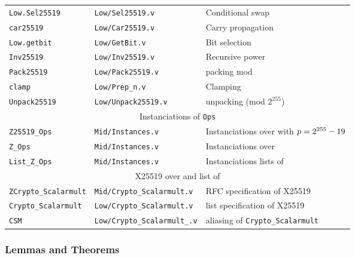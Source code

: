 \begin{table}[h]
\begin{tabular}{ l | l | l }
    \texttt{Low.Sel25519} & \texttt{Low/Sel25519.v} & Conditional swap \\
    \texttt{car25519} & \texttt{Low/Car25519.v} & Carry propagation \\
    \texttt{Low.getbit} & \texttt{Low/GetBit.v} & Bit selection \\
    \texttt{Inv25519} & \texttt{Low/Inv25519.v} & Recursive power \\
    \texttt{Pack25519} & \texttt{Low/Pack25519.v} & packing mod \p\\
    \texttt{clamp} & \texttt{Low/Prep\_n.v} & Clamping \\
    \texttt{Unpack25519} & \texttt{Low/Unpack25519.v} & unpacking (mod $2^{255}$)\\
    \hline
    \multicolumn{3}{c}{Instanciations of \texttt{Ops}}\\
    \hline
    \texttt{Z25519\_Ops} & \texttt{Mid/Instances.v} & Instanciations over \F{p} with $p = 2^{255}-19$\\
    \texttt{Z\_Ops} & \texttt{Mid/Instances.v} & Instanciations over \Z \\
    \texttt{List\_Z\_Ops} & \texttt{Mid/Instances.v} & Instanciations lists of \Z \\
    \hline
    \multicolumn{3}{c}{X25519 over \Z and list of \Z}\\
    \hline
    \texttt{ZCrypto\_Scalarmult} & \texttt{Mid/Crypto\_Scalarmult.v} & RFC specification of X25519\\
    \texttt{Crypto\_Scalarmult} & \texttt{Low/Crypto\_Scalarmult.v} & list specification of X25519\\
    \texttt{CSM} & \texttt{Low/Crypto\_Scalarmult\_.v} & aliasing of \texttt{Crypto\_Scalarmult} \\
    \hline
\end{tabular}
\end{table}

\subsubsection{Lemmas and Theorems}
~

